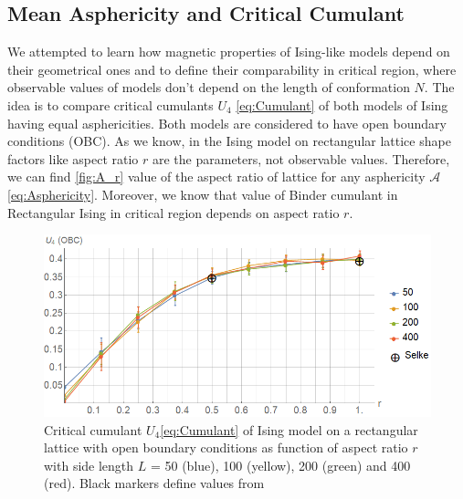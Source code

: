 \documentclass[aps,pre,amssymb,amsmath,twocolumn,floatfix]{revtex4-2}
\begin{document}
\subsection{Mean Asphericity and Critical Cumulant}



We attempted to learn how magnetic properties of Ising-like models depend on their geometrical ones and to define their comparability in critical region, where observable values of models don't depend on the length of conformation $N$. The idea is to compare critical cumulants $U_{4}$ \eqref{eq:Cumulant} of both models of Ising having equal asphericities. Both models are considered to have open boundary conditions (OBC). As we know, in the Ising model on rectangular lattice shape factors like aspect ratio $r$ are the parameters, not observable values. Therefore, we can find \eqref{fig:A_r} value of the aspect ratio of lattice for any asphericity $\mathcal{A}$ \eqref{eq:Asphericity}. Moreover, we know that value of Binder cumulant in Rectangular Ising\cite{Selke2006} in critical region depends on aspect ratio $r$. 

\begin{figure}[h]
    \centering
    \includegraphics[width=\columnwidth]{Images/CumulantOBC.png}
    \caption{Critical cumulant $U_{4}$\eqref{eq:Cumulant} of Ising model on a rectangular lattice with open boundary conditions as function of aspect ratio $r$ with side length $L$ = 50 (blue), 100 (yellow), 200 (green) and 400 (red). Black markers define values from \cite{Selke2006}}
    \label{fig:A_r}
\end{figure}
\end{document}
